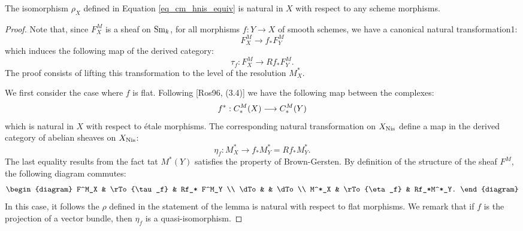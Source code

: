 \begin{lem}
The isomorphism $\rho_X$ defined in Equation 
\ref{eq_cm_hnis_equiv} is natural in $X$ with respect to any
scheme morphisms.
\end{lem}
\begin{proof}
Note that, since $F^M_X$ is a sheaf on $\mathrm{Sm}_{k}$, for all 
morphisms $f: Y \to X$ of smooth schemes, we have a canonical
natural transformation1:
\[
F^M_X \to f_*F^M_Y
\]
which induces the following map of the derived category:
\[
\tau_f: F^M_X \to Rf_*F^M_Y.
\]
The proof consists of lifting this transformation to the level
of the resolution $M^*_X$.

We first consider the case where $f$ is flat. Following 
[Ros96, (3.4)] we have the following map between the complexes:
\[
f^*: C_*^{M}(X) \longrightarrow C_*^{M}(Y)
\]
which is natural in $X$ with respect to \'etale morphisms. The
corresponding natural transformation on $X_{\mathrm{Nis}}$ define a map
in the derived category of abelian sheaves on $X_{\mathrm{Nis}}$:
\begin{equation}\label{eq_3_3_a}
\eta_f: M^*_X \to f_*M^*_Y = Rf_*M^*_Y.
\end{equation}
The last equality results from the fact tat $M^*(Y)$ satisfies
the property of Brown-Gersten. By definition of the structure of
the sheaf $F^M$, the following diagram commutes:
\[
\begin{diagram}
F^M_X  & \rTo{\tau_f} & Rf_* F^M_Y \\
\dTo   &              & \dTo       \\
M^*_X & \rTo{\eta_f} & Rf_*M^*_Y.
\end{diagram}
\]
In this case, it follows the $\rho$ defined in the statement of
the lemma is natural with respect to flat morphisms. We remark
that if $f$ is the projection of a vector bundle, then $\eta_f$
is a quasi-isomorphism.


\end{proof}
